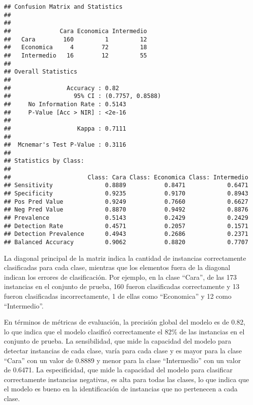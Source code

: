 \documentclass[
]{article}
\begin{document}
\begin{verbatim}
## Confusion Matrix and Statistics
## 
##             
##              Cara Economica Intermedio
##   Cara        160         1         12
##   Economica     4        72         18
##   Intermedio   16        12         55
## 
## Overall Statistics
##                                           
##                Accuracy : 0.82            
##                  95% CI : (0.7757, 0.8588)
##     No Information Rate : 0.5143          
##     P-Value [Acc > NIR] : <2e-16          
##                                           
##                   Kappa : 0.7111          
##                                           
##  Mcnemar's Test P-Value : 0.3116          
## 
## Statistics by Class:
## 
##                      Class: Cara Class: Economica Class: Intermedio
## Sensitivity               0.8889           0.8471            0.6471
## Specificity               0.9235           0.9170            0.8943
## Pos Pred Value            0.9249           0.7660            0.6627
## Neg Pred Value            0.8870           0.9492            0.8876
## Prevalence                0.5143           0.2429            0.2429
## Detection Rate            0.4571           0.2057            0.1571
## Detection Prevalence      0.4943           0.2686            0.2371
## Balanced Accuracy         0.9062           0.8820            0.7707
\end{verbatim}

La diagonal principal de la matriz indica la cantidad de instancias
correctamente clasificadas para cada clase, mientras que los elementos
fuera de la diagonal indican los errores de clasificación. Por ejemplo,
en la clase ``Cara'', de las 173 instancias en el conjunto de prueba,
160 fueron clasificadas correctamente y 13 fueron clasificadas
incorrectamente, 1 de ellas como ``Economica'' y 12 como ``Intermedio''.

En términos de métricas de evaluación, la precisión global del modelo es
de 0.82, lo que indica que el modelo clasificó correctamente el 82\% de
las instancias en el conjunto de prueba. La sensibilidad, que mide la
capacidad del modelo para detectar instancias de cada clase, varía para
cada clase y es mayor para la clase ``Cara'' con un valor de 0.8889 y
menor para la clase ``Intermedio'' con un valor de 0.6471. La
especificidad, que mide la capacidad del modelo para clasificar
correctamente instancias negativas, es alta para todas las clases, lo
que indica que el modelo es bueno en la identificación de instancias que
no pertenecen a cada clase.
\end{document}
